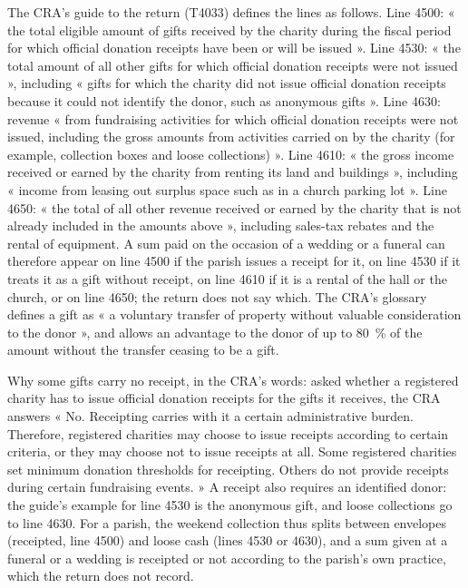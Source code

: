\documentclass[11pt,letterpaper]{article}
\begin{document}
The CRA's guide to the return (T4033) defines the lines as follows. Line 4500: « the total eligible amount of gifts received by the charity during the fiscal period for which official donation receipts have been or will be issued ». Line 4530: « the total amount of all other gifts for which official donation receipts were not issued », including « gifts for which the charity did not issue official donation receipts because it could not identify the donor, such as anonymous gifts ». Line 4630: revenue « from fundraising activities for which official donation receipts were not issued, including the gross amounts from activities carried on by the charity (for example, collection boxes and loose collections) ». Line 4610: « the gross income received or earned by the charity from renting its land and buildings », including « income from leasing out surplus space such as in a church parking lot ». Line 4650: « the total of all other revenue received or earned by the charity that is not already included in the amounts above », including sales-tax rebates and the rental of equipment. A sum paid on the occasion of a wedding or a funeral can therefore appear on line 4500 if the parish issues a receipt for it, on line 4530 if it treats it as a gift without receipt, on line 4610 if it is a rental of the hall or the church, or on line 4650; the return does not say which. The CRA's glossary defines a gift as « a voluntary transfer of property without valuable consideration to the donor », and allows an advantage to the donor of up to 80~\% of the amount without the transfer ceasing to be a gift.

Why some gifts carry no receipt, in the CRA's words: asked whether a registered charity has to issue official donation receipts for the gifts it receives, the CRA answers « No. Receipting carries with it a certain administrative burden. Therefore, registered charities may choose to issue receipts according to certain criteria, or they may choose not to issue receipts at all. Some registered charities set minimum donation thresholds for receipting. Others do not provide receipts during certain fundraising events. » A receipt also requires an identified donor: the guide's example for line 4530 is the anonymous gift, and loose collections go to line 4630. For a parish, the weekend collection thus splits between envelopes (receipted, line 4500) and loose cash (lines 4530 or 4630), and a sum given at a funeral or a wedding is receipted or not according to the parish's own practice, which the return does not record.
\end{document}
